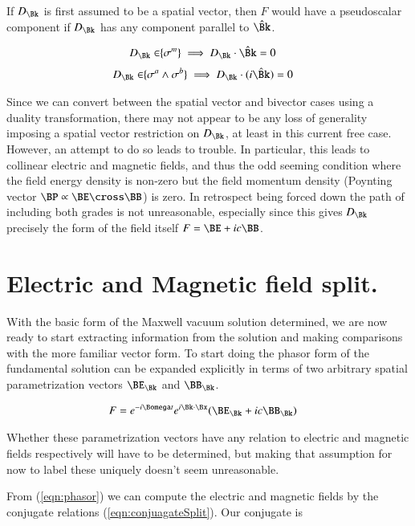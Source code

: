If $D_\Bk$ is first assumed to be a spatial vector, then $F$ would have a pseudoscalar component if $D_\Bk$ has any component parallel to $\hat{\Bk}$.

\begin{align}\label{eqn:commutationRequirementVector}
D_\Bk \in \span\{\sigma^m\} \implies D_\Bk \cdot \hat{\Bk} = 0
\end{align}
\begin{align}\label{eqn:commutationRequirementBiVector}
D_\Bk \in \span\{\sigma^a \wedge \sigma^b\} \implies D_\Bk \cdot (i\hat{\Bk}) = 0
\end{align}

Since we can convert between the spatial vector and bivector cases using a duality transformation, there may not appear to be any loss of generality imposing a spatial vector restriction on $D_\Bk$, at least in this current free case.  However, an attempt to do so leads to trouble.  In particular, this leads to collinear electric and magnetic fields, and thus the odd seeming condition where the field energy density is non-zero but the field momentum density (Poynting vector $\BP \propto \BE \cross \BB$) is zero.  In retrospect being forced down the path of including both grades is not unreasonable, especially since this gives $D_\Bk$ precisely the form of the field itself $F = \BE + i c \BB$.

\section{Electric and Magnetic field split.}

With the basic form of the Maxwell vacuum solution determined, we are now ready to start extracting information from the solution and making comparisons with the more familiar vector form.  To start doing the phasor form of the fundamental solution can be expanded explicitly in terms of two arbitrary spatial parametrization vectors $\BE_\Bk$ and $\BB_\Bk$.

\begin{align}\label{eqn:phasor}
F &= e^{-i\Bomega t} e^{i \Bk \cdot \Bx} (\BE_\Bk + i c \BB_\Bk)
\end{align}

Whether these parametrization vectors have any relation to electric and magnetic fields respectively will have to be determined, but making that assumption for now to label these uniquely doesn't seem unreasonable.

From (\ref{eqn:phasor}) we can compute the electric and magnetic fields by the conjugate relations (\ref{eqn:conjuagateSplit}).  Our conjugate is

